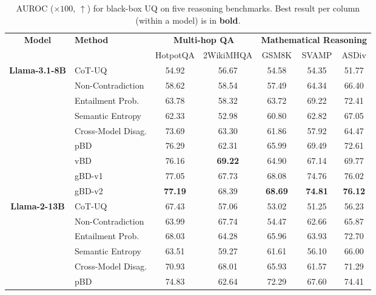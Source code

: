 \documentclass[twoside]{article}
\begin{document}
\begin{table}[t]
  \caption{AUROC ($\times 100$, $\uparrow$) for black-box UQ on five reasoning
  benchmarks. Best result per column (within a model) is in \textbf{bold}.}
  \label{tab:main-results}
  \centering
  \footnotesize
  \setlength{\tabcolsep}{6pt}
  \begin{tabular}{c l cc ccc}
    \toprule
    \multirow{2}{*}{\textbf{Model}} & \multirow{2}{*}{\textbf{Method}}
      & \multicolumn{2}{c}{\textbf{Multi-hop QA}}
      & \multicolumn{3}{c}{\textbf{Mathematical Reasoning}} \\
    \cmidrule(lr){3-4}\cmidrule(lr){5-7}
      & & HotpotQA & 2WikiMHQA & GSM8K & SVAMP & ASDiv \\
    \midrule
    \multirow{9}{*}{\textbf{Llama-3.1-8B}}
      & CoT-UQ                  & 54.92 & 56.67 & 54.58 & 54.35 & 51.77 \\
      & Non-Contradiction       & 58.62 & 58.54 & 57.49 & 64.34 & 66.40 \\
      & Entailment Prob.        & 63.78 & 58.32 & 63.72 & 69.22 & 72.41 \\
      & Semantic Entropy        & 62.33 & 52.98 & 60.80 & 62.82 & 67.05 \\
      & Cross-Model Disag.      & 73.69 & 63.30 & 61.86 & 57.92 & 64.47 \\
    \cmidrule(lr){2-7}
      & pBD                     & 76.29 & 62.31 & 65.99 & 69.49 & 72.61 \\
      & vBD                     & 76.16 & \textbf{69.22} & 64.90 & 67.14 & 69.77 \\
      & gBD-v1                  & 77.05 & 67.73 & 68.08 & 74.76 & 76.02 \\
      & gBD-v2                  & \textbf{77.19} & 68.39 & \textbf{68.69} & \textbf{74.81} & \textbf{76.12} \\
    \midrule
    \multirow{9}{*}{\textbf{Llama-2-13B}}
      & CoT-UQ                  & 67.43 & 57.06 & 53.02 & 51.25 & 56.23 \\
      & Non-Contradiction       & 63.99 & 67.74 & 54.47 & 62.66 & 65.87 \\
      & Entailment Prob.        & 68.03 & 64.28 & 65.96 & 63.93 & 72.70 \\
      & Semantic Entropy        & 63.51 & 59.27 & 61.61 & 56.10 & 66.00 \\
      & Cross-Model Disag.      & 70.93 & 68.01 & 65.93 & 61.57 & 71.29 \\
    \cmidrule(lr){2-7}
      & pBD                     & 74.83 & 62.64 & 72.29 & 67.60 & 74.41 \\

\end{tabular}
\end{table}
\end{document}
